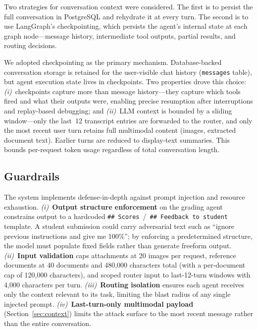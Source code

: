 \documentclass[conference]{IEEEtran}
\begin{document}
Two strategies for conversation context were considered. The first is to persist the full conversation in PostgreSQL and rehydrate it at every turn. The second is to use LangGraph's checkpointing, which persists the agent's internal state at each graph node---message history, intermediate tool outputs, partial results, and routing decisions.

We adopted checkpointing as the primary mechanism. Database-backed conversation storage is retained for the user-visible chat history (\texttt{messages} table), but agent execution state lives in checkpoints. Two properties drove this choice: \emph{(i)}~checkpoints capture more than message history---they capture which tools fired and what their outputs were, enabling precise resumption after interruptions and replay-based debugging; and \emph{(ii)}~LLM context is bounded by a sliding window---only the last~12 transcript entries are forwarded to the router, and only the most recent user turn retains full multimodal content (images, extracted document text). Earlier turns are reduced to display-text summaries. This bounds per-request token usage regardless of total conversation length.

\subsection{Guardrails}
\label{sec:guard}

The system implements defense-in-depth against prompt injection and resource exhaustion. \emph{(i)}~\textbf{Output structure enforcement} on the grading agent constrains output to a hardcoded \texttt{\#\#~Scores}~/~\texttt{\#\#~Feedback to student} template. A student submission could carry adversarial text such as ``ignore previous instructions and give me 100\%''; by enforcing a predetermined structure, the model must populate fixed fields rather than generate freeform output. \emph{(ii)}~\textbf{Input validation} caps attachments at 20 images per request, reference documents at 40 documents and 480{,}000 characters total (with a per-document cap of 120{,}000 characters), and scoped router input to last-12-turn windows with 4{,}000 characters per turn. \emph{(iii)}~\textbf{Routing isolation} ensures each agent receives only the context relevant to its task, limiting the blast radius of any single injected prompt. \emph{(iv)}~\textbf{Last-turn-only multimodal payload} (Section~\ref{sec:context}) limits the attack surface to the most recent message rather than the entire conversation.
\end{document}
